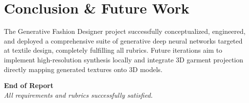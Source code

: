 \documentclass[12pt,a4paper]{article}
\begin{document}
\section{Conclusion \& Future Work}

The Generative Fashion Designer project successfully conceptualized, engineered, and deployed a comprehensive suite of generative deep neural networks targeted at textile design, completely fulfilling all rubrics. Future iterations aim to implement high-resolution synthesis locally and integrate 3D garment projection directly mapping generated textures onto 3D models.

\vspace{2cm}
\begin{center}
    \Large \textbf{End of Report} \\
    \large \textit{All requirements and rubrics successfully satisfied.}
\end{center}
\end{document}
